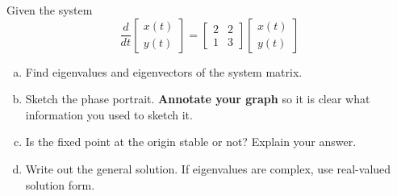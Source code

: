       \newpage
      \begin{question}
      Given the system
        \[
          \frac{d}{dt}
          \begin{bmatrix}
            x(t) \\ y(t)
          \end{bmatrix} =
          \begin{bmatrix}
            2 & 2 \\ 1 & 3
          \end{bmatrix}
          \begin{bmatrix}
            x(t) \\ y(t)
          \end{bmatrix}
        \]
        \begin{enumerate}[(a)]
        \item Find eigenvalues and eigenvectors of the system matrix. 
      \solspace{3.5in}
      \item Sketch the phase portrait. \textbf{Annotate your graph} so it is clear what information you used to sketch it.
        \begin{center}
      \end{center}
        \item Is the fixed point at the origin stable or not? Explain your answer.
          \solspace{0.5in}
        \item Write out the general solution. If eigenvalues are complex, use real-valued solution form.
          \solspace{0.5in}

      \end{enumerate}
      \end{question}


